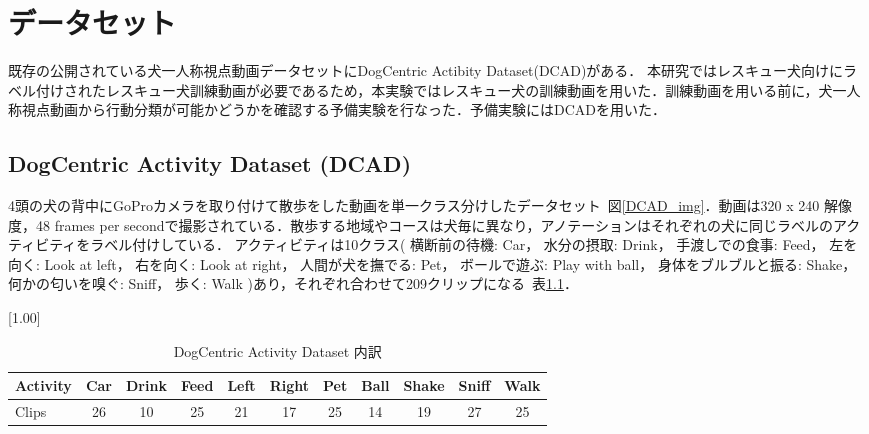 \chapter{データセット}
既存の公開されている犬一人称視点動画データセットにDogCentric Actibity Dataset(DCAD)がある．
本研究ではレスキュー犬向けにラベル付けされたレスキュー犬訓練動画が必要であるため，本実験ではレスキュー犬の訓練動画を用いた．訓練動画を用いる前に，犬一人称視点動画から行動分類が可能かどうかを確認する予備実験を行なった．予備実験にはDCADを用いた．
\section{DogCentric Activity Dataset (DCAD)}
4頭の犬の背中にGoProカメラを取り付けて散歩をした動画を単一クラス分けしたデータセット~図\ref{DCAD_img}．動画は320 x 240 解像度，48 frames per secondで撮影されている．散歩する地域やコースは犬毎に異なり，アノテーションはそれぞれの犬に同じラベルのアクティビティをラベル付けしている．
アクティビティは10クラス(
横断前の待機: Car， 水分の摂取: Drink， 手渡しでの食事: Feed， 左を向く: Look at left， 右を向く: Look at right， 人間が犬を撫でる: Pet， ボールで遊ぶ: Play with ball， 身体をブルブルと振る: Shake， 何かの匂いを嗅ぐ: Sniff， 歩く: Walk
)あり，それぞれ合わせて209クリップになる~表\ref{DCADlabel}．
\begin{table}[tb]
 \centering
 \caption{DogCentric Activity Dataset 内訳}\label{DCADlabel}
 \scalebox{1.00}[1.00]{
  \begin{tabular}{|l||c|c|c|c|c|c|c|c|c|c|}
   \hline \hline
   Activity& Car &Drink& Feed& Left&Right& Pet & Ball&Shake&Sniff&Walk \\ \hline
   Clips   &   26&   10&   25&   21&   17&   25&   14&   19&   27&   25\\ \hline
  \end{tabular}
 }

\end{table}

